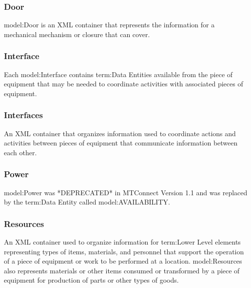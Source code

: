 \FloatBarrier

\subsubsection{Door}
  \label{sec:Door}


{model:Door} is an XML container that represents the information for a mechanical mechanism or closure that can cover.

\FloatBarrier

\subsubsection{Interface}
  \label{sec:Interface}


Each {model:Interface} contains {term:Data Entities} available from the piece of equipment that may be needed to coordinate activities with associated pieces of equipment.

\FloatBarrier

\subsubsection{Interfaces}
  \label{sec:Interfaces}


An XML container that organizes information used to coordinate actions and activities between pieces of equipment that communicate information between each other.

\FloatBarrier

\subsubsection{Power}
  \label{sec:Power}


{model:Power} was *DEPRECATED* in MTConnect Version 1.1 and was replaced by the {term:Data Entity} called {model:AVAILABILITY}.

\FloatBarrier

\subsubsection{Resources}
  \label{sec:Resources}


An XML container used to organize information for {term:Lower Level} elements representing types of items, materials, and personnel that support the operation of a piece of equipment or work to be performed at a location. {model:Resources} also represents materials or other items consumed or transformed by a piece of equipment for production of parts or other types of goods.

